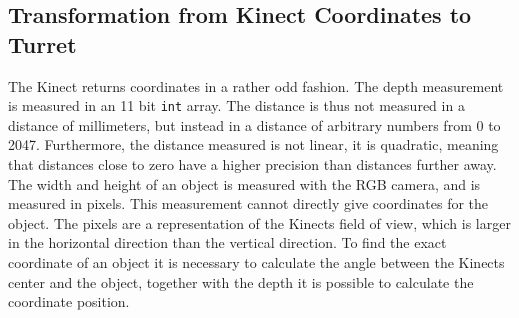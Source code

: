 \subsection{Transformation from Kinect Coordinates to Turret}
The Kinect returns coordinates in a rather odd fashion. The depth measurement is measured in an 11 bit \texttt{int} array\cite{kinectdistance}. The distance is thus not measured in a distance of millimeters, but instead in a distance of arbitrary numbers from 0 to 2047. Furthermore, the distance measured is not linear, it is quadratic, meaning that distances close to zero have a higher precision than distances further away.
The width and height of an object is measured with the RGB camera, and is measured in pixels. This measurement cannot directly give coordinates for the object. The pixels are a representation of the Kinects field of  view, which is larger in the horizontal direction than the vertical direction. To find the exact coordinate of an object it is necessary to calculate the angle between the Kinects center and the object, together with the depth it is possible to calculate the coordinate position.